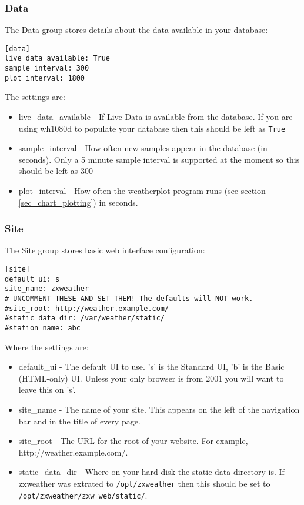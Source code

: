 \documentclass[a4paper,10pt,draft]{book}
\begin{document}
\subsubsection{Data}
The Data group stores details about the data available in your database:

\begin{verbatim}
[data]
live_data_available: True
sample_interval: 300
plot_interval: 1800
\end{verbatim}

The settings are:
\begin{itemize}
\item live\_data\_available - If Live Data is available from the database. If you are using wh1080d to populate your database then this should be left as \verb|True|
\item sample\_interval - How often new samples appear in the database (in seconds). Only a 5 minute sample interval is supported at the moment so this should be left as 300
\item plot\_interval - How often the weatherplot program runs (see section \ref{sec_chart_plotting}) in seconds. 
\end{itemize}

\subsubsection{Site}
The Site group stores basic web interface configuration:
\begin{verbatim}
[site]
default_ui: s
site_name: zxweather
# UNCOMMENT THESE AND SET THEM! The defaults will NOT work.
#site_root: http://weather.example.com/
#static_data_dir: /var/weather/static/
#station_name: abc
\end{verbatim}

Where the settings are:
\begin{itemize}
\item default\_ui - The default UI to use. 's' is the Standard UI, 'b' is the Basic (HTML-only) UI. Unless your only browser is from 2001 you will want to leave this on 's'.
\item site\_name - The name of your site. This appears on the left of the navigation bar and in the title of every page.
\item site\_root - The URL for the root of your website. For example, http://weather.example.com/.
\item static\_data\_dir - Where on your hard disk the static data directory is. If zxweather was extrated to \verb|/opt/zxweather| then this should be set to \verb|/opt/zxweather/zxw_web/static/|.
\end{itemize}
\end{document}
